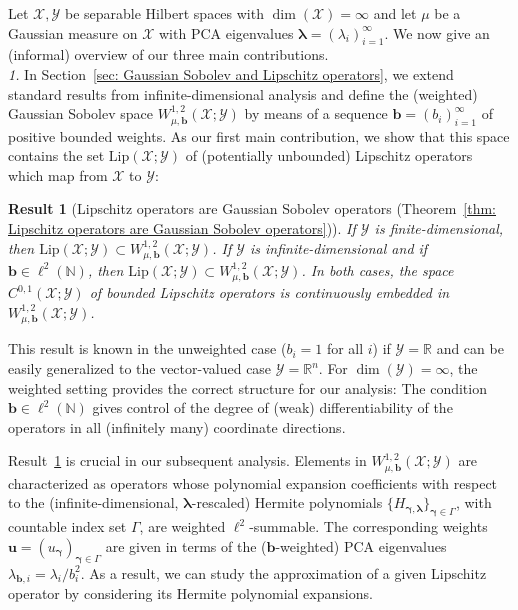\documentclass[namedate,webpdf]{ima-authoring-template-blank}
\newcommand*{\Lip}{\mathrm{Lip}}  %
\numberwithin{counter}{section}
\numberwithin{equation}{section}
\theoremstyle{plain}
\newtheorem{result}{Result}
\theoremstyle{definition}
\newcommand*{\cX}{\mathcal{X}}
\newcommand*{\cY}{\mathcal{Y}}
\newcommand*{\bbN}{\mathbb{N}}
\newcommand*{\bbR}{\mathbb{R}}
\theoremstyle{thmstyletwo}
\begin{document}
Let \(\cX, \cY\) be separable Hilbert spaces with \(\dim(\cX) = \infty\) and let \(\mu\) be a Gaussian measure on \(\cX\) with PCA eigenvalues \( \bm{\lambda} = ( \lambda_i)_{i = 1}^{\infty} \). We now give an (informal) overview of our three main contributions. \\

\noindent\textit{1.}
In Section~\ref{sec: Gaussian Sobolev and Lipschitz operators}, we extend standard results from infinite-dimensional analysis and define the (weighted) Gaussian Sobolev space \(W_{\mu, \bm{b}}^{1, 2}(\cX; \cY)\) by means of a sequence \(\bm{b} = (b_i)_{i = 1}^{\infty}\) of positive bounded weights. As our first main contribution, we show that this space contains the set \(\Lip(\cX; \cY)\) of (potentially unbounded) Lipschitz operators which map from \(\cX\) to \(\cY\):
\begin{result}[Lipschitz operators are Gaussian Sobolev operators (Theorem~\ref{thm: Lipschitz operators are Gaussian Sobolev operators})]
\label{res: Lipschitz operators are Gaussian Sobolev operators}
     If \(\cY\) is finite-dimensional, then \(\Lip(\cX; \cY) \subset W_{\mu, \bm{b}}^{1,2}(\cX; \cY)\).
     If \(\cY\) is infinite-dimensional and if \(\bm{b} \in \ell^2(\bbN)\), then \(\Lip(\cX; \cY) \subset W_{\mu, \bm{b}}^{1,2}(\cX; \cY)\). In both cases, the space \(C^{0,1}(\cX; \cY)\) of bounded Lipschitz operators is continuously embedded in \(W_{\mu, \bm{b}}^{1,2}(\cX; \cY)\).
\end{result}
This result is known in the unweighted case (\( b_i = 1 \) for all \( i \)) if \( \cY = \bbR \) and can be easily generalized to the vector-valued case \( \cY = \bbR^n \). For \( \dim(\cY) = \infty \), the weighted setting provides the correct structure for our analysis: The condition \( \bm{b} \in \ell^2(\bbN) \) gives control of the degree of (weak) differentiability of the operators in all (infinitely many) coordinate directions.

Result~\ref{res: Lipschitz operators are Gaussian Sobolev operators} is crucial in our subsequent analysis. Elements in \(W_{\mu, \bm{b}}^{1, 2}(\cX; \cY)\) are characterized as operators whose polynomial expansion coefficients with respect to the (infinite-dimensional, \(\bm{\lambda}\)-rescaled) Hermite polynomials \(\{H_{\bm{\gamma}, \bm{\lambda}}\}_{\bm{\gamma} \in \Gamma}\), with countable index set \(\Gamma\), are weighted \(\ell^2\)-summable. The corresponding weights \(\bm{u} = (u_{\bm{\gamma}})_{\bm{\gamma} \in \Gamma}\) are given in terms of the (\(\bm{b}\)-weighted) PCA eigenvalues \(\lambda_{\bm{b}, i} = \lambda_i / b_i^2\). As a result, we can study the approximation of a given Lipschitz operator by considering its Hermite polynomial expansions. \\
\end{document}

